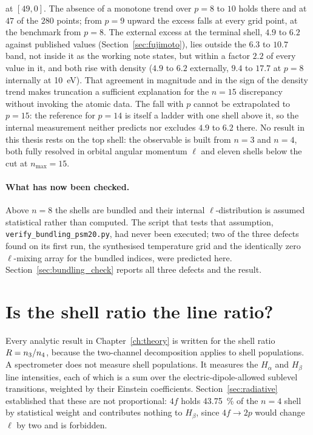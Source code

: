 at $[49,0]$. The absence of a monotone trend over $p=8$ to $10$ holds there and at $47$ of the $280$ points;
from $p=9$ upward the excess falls at every grid point, at the benchmark from $p=8$. The external excess at the
terminal shell, $4.9$ to $6.2$ against published values (Section~\ref{sec:fujimoto}), lies outside the $6.3$ to
$10.7$ band, not inside it as the working note states, but within a factor $2.2$ of every value in it, and both rise
with density ($4.9$ to $6.2$ externally, $9.4$ to $17.7$ at $p=8$ internally at \SI{10}{\electronvolt}). That
agreement in magnitude and in the sign of the density trend makes truncation a sufficient explanation for the
$n=15$ discrepancy without invoking the atomic data. The fall with $p$ cannot be extrapolated to $p=15$: the
reference for $p=14$ is itself a ladder with one shell above it, so the internal measurement neither predicts nor
excludes $4.9$ to $6.2$ there.
No result in this thesis rests on the
top shell: the observable is built from $n=3$ and $n=4$, both fully resolved in
orbital angular momentum $\ell$ and eleven shells below the cut at
$n_{\max}=15$.

\paragraph{What has now been checked.} Above $n=8$ the shells are bundled and
their internal $\ell$-distribution is assumed statistical rather than computed.
The script that tests that assumption, \texttt{verify\_bundling\_psm20.py}, had
never been executed; two of the three defects found on its first run, the
synthesised temperature grid and the identically zero $\ell$-mixing array for
the bundled indices, were predicted here. Section~\ref{sec:bundling_check}
reports all three defects and the result.

\section{Is the shell ratio the line ratio?}
\label{sec:balmer_equivalence}

Every analytic result in Chapter~\ref{ch:theory} is written for the shell ratio
$R = n_3/n_4$, because the two-channel decomposition applies to shell
populations. A spectrometer does not measure shell populations. It measures the
$H_\alpha$ and $H_\beta$ line intensities, each of which is a sum over the
electric-dipole-allowed sublevel transitions, weighted by their Einstein
coefficients. Section~\ref{sec:radiative} established that these are not
proportional: $4f$ holds \SI{43.75}{\percent} of the $n=4$ shell by statistical
weight and contributes nothing to $H_\beta$, since $4f\to2p$ would change $\ell$
by two and is forbidden.

